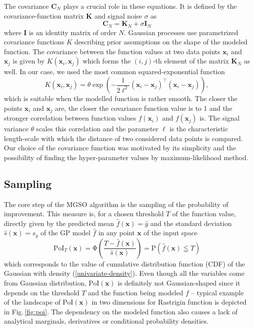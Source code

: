 \documentclass{itatnew}
\newcommand{\xx}{\mathrm{\mathbf{x}}}
\newcommand{\CC}{\mathrm{\mathbf{C}}}
\begin{document}
The covariance $\CC_N$ plays a crucial role in these equations. It is defined by the covariance-function matrix $\mathbf{K}$ and signal noise $\sigma$ as
\begin{equation}
  \CC_N = \mathbf{K}_N + \sigma \mathbf{I}_N
\end{equation}
where $\mathbf{I}$ is an identity matrix of order $N$. Gaussian processes use parametrized covariance functions $K$ describing prior assumptions on the shape of the modeled function. The covariance between the function values at two data points $\xx_i$ and $\xx_j$ is given by $K(\xx_i, \xx_j)$ which forms the $(i,j)$-th element of the matrix $\mathbf{K}_N$ as well. In our case, we used the most common squared-exponential function
\begin{equation}
K(\xx_i, \xx_j) = \theta \exp \left( -\frac{1}{2\ell^2} (\xx_i - \xx_j)^\top(\xx_i - \xx_j) \right), %
\end{equation}
which is suitable when the modelled function is rather smooth. The closer the points $\xx_i$ and $\xx_j$ are, the closer the covariance function value is to 1 and the stronger correlation between function values $f(\xx_i)$ and $f(\xx_j)$ is. The signal variance $\theta$ scales this correlation
and the parameter $\ell$ is the characteristic length-scale with which the distance of two considered data points is compared. Our choice of the covariance function was motivated by its simplicity and the possibility of finding the hyper-parameter values by maximum-likelihood method. 


\subsection{Sampling}
\label{sec:sampling}

The core step of the MGSO algorithm is the sampling of the probability of improvement. This measure is, for a chosen threshold $T$ of the function value, directly given by the predicted mean $\hat{f}(\xx) = \hat{y}$ and the standard deviation $\hat{s}(\xx) = s_{y}$ of the GP model $\hat{f}$ in any point $\xx$ of the input space
\begin{equation}
  \mathrm{PoI}_T(\xx) = \mathrm{\Phi}\left( \frac{T - \hat{f}(\xx)}{\hat{s}(\xx)} \right) = \mathrm{P}(\hat{f}(\xx) \leqq T)
\end{equation}
which corresponds to the value of cumulative distribution function (CDF) of the Gaussian with density (\ref{univariate-density}). Even though all the variables come from Gaussian distribution, $\mathrm{PoI}(\xx)$ is definitely not Gaussian-shaped since it depends on the threshold $T$ and the function being modeled $f$ -- typical example of the landscape of $\textrm{PoI}(\xx)$ in two dimensions for Rastrigin function is depicted in Fig.\,\ref{fig:poi}.
The dependency on the modeled function also causes a lack of analytical marginals, derivatives or conditional probability densities.
\end{document}
